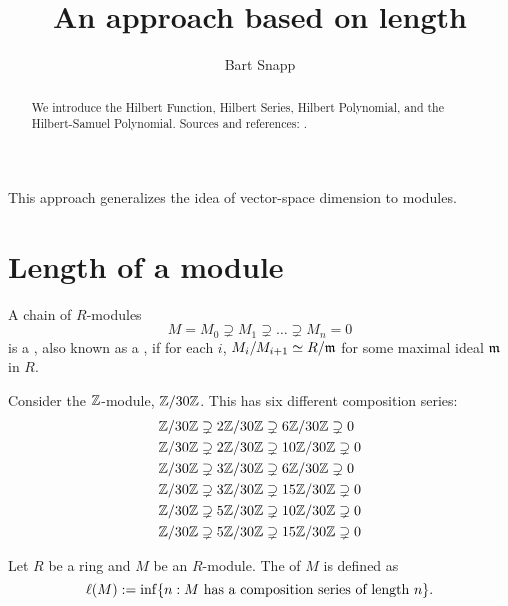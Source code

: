 \documentclass{ximera}
\author{Bart Snapp}
\title{An approach based on length}
\begin{document}
\begin{abstract}
  We introduce the Hilbert Function, Hilbert Series, Hilbert
  Polynomial, and the Hilbert-Samuel Polynomial. Sources and
  references: \cite{AK2012,rA2006,hM1986,hS2003}.
\end{abstract}
\maketitle


This approach generalizes the idea of vector-space dimension to modules. 

\section{Length of a module}





\begin{definition}
  A chain of $R$-modules
  \[
  M = M_0 \supsetneq M_1\supsetneq \dots \supsetneq M_n =0
  \]
  is a , also known as a ,
  if for each $i$, $M_i/M_{i+1}\simeq R/\mathfrak{m}$ for some maximal
  ideal $\mathfrak{m}$ in $R$.
\end{definition}


\begin{example}
  Consider the $\mathbb Z$-module, $\mathbb Z/30\mathbb Z$. This has six different
  composition series:
  \begin{align*}
  &\mathbb Z/30\mathbb Z \supsetneq 2\mathbb Z/30\mathbb Z \supsetneq 6\mathbb Z/30\mathbb Z \supsetneq 0\\
  &\mathbb Z/30\mathbb Z \supsetneq 2\mathbb Z/30\mathbb Z \supsetneq 10\mathbb Z/30\mathbb Z \supsetneq 0\\
  &\mathbb Z/30\mathbb Z \supsetneq 3\mathbb Z/30\mathbb Z \supsetneq 6\mathbb Z/30\mathbb Z \supsetneq 0\\
  &\mathbb Z/30\mathbb Z \supsetneq 3\mathbb Z/30\mathbb Z \supsetneq 15\mathbb Z/30\mathbb Z \supsetneq 0\\
  &\mathbb Z/30\mathbb Z \supsetneq 5\mathbb Z/30\mathbb Z \supsetneq 10\mathbb Z/30\mathbb Z \supsetneq 0\\
  &\mathbb Z/30\mathbb Z \supsetneq 5\mathbb Z/30\mathbb Z \supsetneq 15\mathbb Z/30\mathbb Z \supsetneq 0
  \end{align*}
\end{example}



\begin{definition}
  Let $R$ be a ring and $M$ be an $R$-module. The  of $M$
  is defined as
  \[
  \ell(M) := \inf \{n: \text{$M$ has a composition series of length $n$}\}.
  \]
\end{definition}
\end{document}
